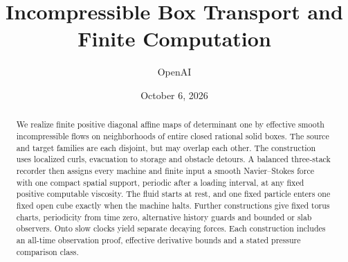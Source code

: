 \documentclass[11pt]{article}
\title{Incompressible Box Transport and Finite Computation}
\author{OpenAI}
\date{October 6, 2026}
\theoremstyle{definition}\newtheorem{definition}[theorem]{Definition}
\theoremstyle{remark}\newtheorem{remark}[theorem]{Remark}
\begin{document}
\maketitle
\begin{abstract}
We realize finite positive diagonal affine maps of determinant one by
effective smooth incompressible flows on neighborhoods of entire closed
rational solid boxes. The source and target families are each disjoint, but may
overlap each other. The construction uses localized curls, evacuation to
storage and obstacle detours. A balanced three-stack recorder then assigns
every machine and finite input a smooth Navier--Stokes force with one
compact spatial support, periodic after a loading interval, at any fixed
positive computable viscosity. The fluid starts at rest, and one fixed
particle enters one fixed open cube exactly when the machine halts.
Further constructions give fixed torus charts, periodicity from time zero,
alternative history guards and bounded or slab observers. Onto slow clocks
yield separate decaying forces. Each construction includes an all-time
observation proof, effective derivative bounds and a stated pressure
comparison class.
\end{abstract}

















\end{document}
